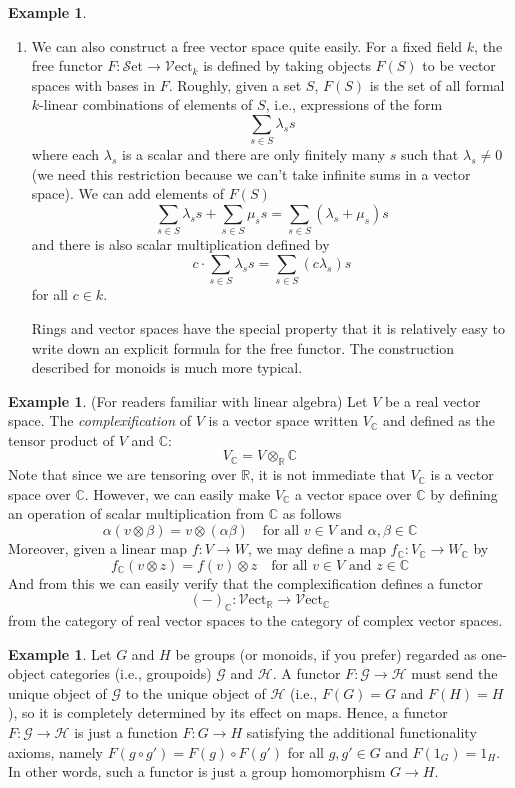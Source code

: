 \documentclass[10pt,oneside]{book}
\def\~#1{\mathscr{#1}}
\newcommand{\C}{\mathbb{C}}
\newcommand{\R}{\mathbb{R}}
\newcommand{\Set}{\~S\mathrm{et}}
\newcommand{\Vect}{\~V\mathrm{ect}}
\theoremstyle{plain}
\theoremstyle{definition}
\newtheorem{ex}[thm]{Example}
\theoremstyle{remark}
\numberwithin{equation}{section}
\numberwithin{figure}{section}
\begin{document}
\begin{ex}
\begin{enumerate}[label=(\roman*)]
        \item We can also construct a free vector space quite easily. For a fixed field $k$, the free functor $F: \Set \to \Vect_k$ is defined by taking objects $F(S)$ to be vector spaces with bases in $F$. Roughly, given a set $S$, $F(S)$ is the set of all formal $k$-linear combinations of elements of $S$, i.e., expressions of the form
        \[\sum_{s \in S} \lambda_s s\]
        where each $\lambda_s$ is a scalar and there are only finitely many $s$ such that $\lambda_s \neq 0$ (we need this restriction because we can't take infinite sums in a vector space). We can add elements of $F(S)$
        \[\sum_{s \in S} \lambda_s s + \sum_{s \in S} \mu_s s = \sum_{s \in S}(\lambda_s + \mu_s)s\]
        and there is also scalar multiplication defined by 
        \[c \cdot \sum_{s \in S} \lambda_s s = \sum_{s \in S}(c \lambda_s)s\]
        for all $c \in k$. 

        Rings and vector spaces have the special property that it is relatively easy to write down an explicit formula for the free functor. The construction described  for monoids is much more typical.

    \end{enumerate}
\end{ex}

\begin{ex}
(For readers familiar with linear algebra) Let $V$ be a real vector space. The \emph{complexification} of $V$ is a vector space written $V_\C$ and defined as the tensor product of $V$ and $\C$:
        \[V_\C = V \otimes_\R \C\]
        Note that since we are tensoring over $\R$, it is not immediate that $V_\C$ is a vector space over $\C$. However, we can easily make $V_\C$ a vector space over $\C$ by defining an operation of scalar multiplication from $\C$ as follows
        \[\alpha(v \otimes \beta) = v \otimes (\alpha \beta) \quad \text{for all } v \in V \text{ and } \alpha, \beta \in \C\]
        Moreover, given a linear map $f: V \to W$, we may define a map $f_\C: V_\C \to W_\C$ by
        \[f_\C(v \otimes z) = f(v) \otimes z \quad \text{for all } v \in V \text{ and } z \in \C\]
        And from this we can easily verify that the complexification defines a functor
        \[(-)_\C: \Vect_\R \to \Vect_\C\]
        from the category of real vector spaces to the category of complex vector spaces.
\end{ex}

\begin{ex}
    Let $G$ and $H$ be groups (or monoids, if you prefer) regarded as one-object categories (i.e., groupoids) $\~G$ and $\~H$. A functor $F: \~G \to \~H$ must send the unique object of $\~G$ to the unique object of $\~H$ (i.e., $F(G) = G$ and $F(H) = H$), so it is completely determined by its effect on maps. Hence, a functor $F: \~G \to \~H$ is just a function $F: G \to H$ satisfying the additional functionality axioms, namely $F(g \circ g') = F(g) \circ F(g')$ for all $g, g' \in G$ and $F(1_G) = 1_H$. In other words, such a functor is just a group homomorphism $G \to H$.
\end{ex}
\end{document}
